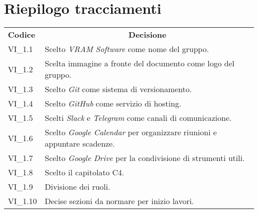 % 
\section{Riepilogo tracciamenti}
\begin{longtable} {
		>{\centering}p{17mm} 
		>{}p{120mm}}
	\rowcolor{gray!50}
	\textbf{Codice} & \multicolumn{1}{c}{\textbf{Decisione}} \\%
	VI\_1.1 & Scelto \textit{VRAM Software} come nome del gruppo. \TBstrut \\ [2mm]
	VI\_1.2 & Scelta immagine a fronte del documento come logo del gruppo. \TBstrut \\ [2mm]
	VI\_1.3 & Scelto \textit{Git} come sistema di versionamento\glo. \TBstrut \\ [2mm]
	VI\_1.4 & Scelto \textit{GitHub} come servizio di hosting. \TBstrut \\ [2mm]
	VI\_1.5 & Scelti \textit{Slack} e \textit{Telegram} come canali di comunicazione. \TBstrut \\ [2mm]
	VI\_1.6 & Scelto \textit{Google Calendar} per organizzare riunioni e appuntare scadenze. \TBstrut \\ [2mm]
	VI\_1.7 & Scelto \textit{Google Drive} per la condivisione di strumenti utili. \TBstrut \\ [2mm]
	VI\_1.8 & Scelto il capitolato C4. \TBstrut \\ [2mm]
	VI\_1.9 & Divisione dei ruoli. \TBstrut \\ [2mm]
	VI\_1.10 & Decise sezioni da normare per inizio lavori. \TBstrut \\ [2mm]
\end{longtable}